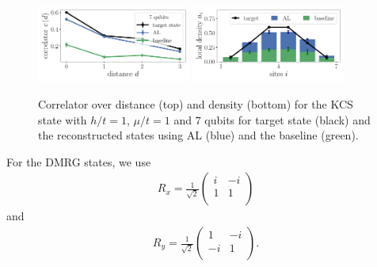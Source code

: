 \documentclass[pra,aps,showpacs,groupedaddress,superscriptaddress,twocolumn,toc=flat,biblatex,footinbib]{revtex4-1}
\renewcommand{\vec}[1]{\bm{#1}}
\begin{document}
\begin{figure}[t]
	\centering
   \includegraphics[width=0.45\textwidth]{Fig16a.pdf}
   \includegraphics[width=0.45\textwidth]{Fig16b.pdf}
	\caption[]{Correlator over distance (top) and density (bottom) for the KCS state with $h/t=1$, $\mu/t=1$ and $7$ qubits for target state (black) and the reconstructed states using AL (blue) and the baseline (green).}
	\label{fig:LGT_h=1_3}
\end{figure}


For the DMRG states, 
we use
\begin{align}
    R_x = \frac{1}{\sqrt{2}}\left( \begin{array}{rr}
i & -i \\ 
1 & 1 \\
\end{array}\right)
\label{eq:R_x}
\end{align}
and 
\begin{align}
    R_y = \frac{1}{\sqrt{2}}\left( \begin{array}{rr}
1 & -i \\ 
-i & 1 \\
\end{array}\right).
\label{eq:R_y}
\end{align}

\end{document}
